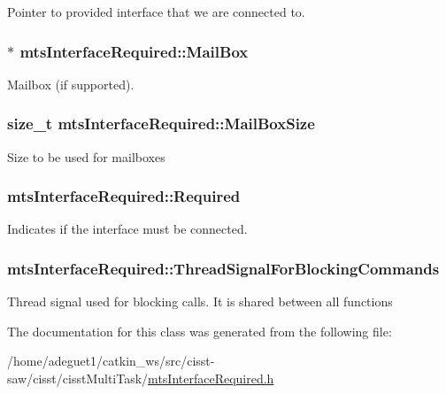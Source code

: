 Pointer to provided interface that we are connected to. \hypertarget{classmts_interface_required_a449f33d73348d11900eead13f009b89c}{
\subsubsection[{Mail\-Box}]{$\ast$ mts\-Interface\-Required\-::\-Mail\-Box\hspace{0.3cm}{\ttfamily [protected]}}}\label{classmts_interface_required_a449f33d73348d11900eead13f009b89c}
Mailbox (if supported). \hypertarget{classmts_interface_required_a7e9f87dc80d231cab9df4bb446df964a}{
\subsubsection[{Mail\-Box\-Size}]{\setlength{\rightskip}{0pt plus 5cm}size\-\_\-t mts\-Interface\-Required\-::\-Mail\-Box\-Size\hspace{0.3cm}{\ttfamily [protected]}}}\label{classmts_interface_required_a7e9f87dc80d231cab9df4bb446df964a}
Size to be used for mailboxes \hypertarget{classmts_interface_required_afab8d38a3a48765ecdf8d4349521f01e}{
\subsubsection[{Required}]{ mts\-Interface\-Required\-::\-Required\hspace{0.3cm}{\ttfamily [protected]}}}\label{classmts_interface_required_afab8d38a3a48765ecdf8d4349521f01e}
Indicates if the interface must be connected. \hypertarget{classmts_interface_required_a99419345347d51f917ed98a270ce9366}{
\subsubsection[{Thread\-Signal\-For\-Blocking\-Commands}]{ mts\-Interface\-Required\-::\-Thread\-Signal\-For\-Blocking\-Commands\hspace{0.3cm}{\ttfamily [protected]}}}\label{classmts_interface_required_a99419345347d51f917ed98a270ce9366}
Thread signal used for blocking calls. It is shared between all functions 

The documentation for this class was generated from the following file\-:\begin{DoxyCompactItemize}
\item 
/home/adeguet1/catkin\-\_\-ws/src/cisst-\/saw/cisst/cisst\-Multi\-Task/\hyperlink{mts_interface_required_8h}{mts\-Interface\-Required.\-h}\end{DoxyCompactItemize}

